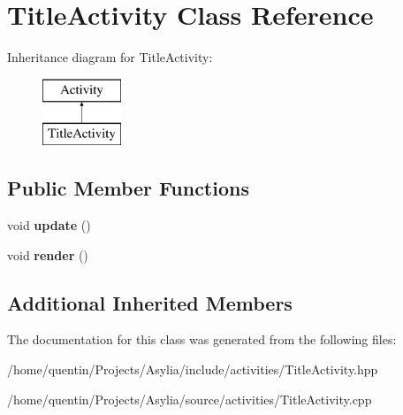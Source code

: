 \hypertarget{classTitleActivity}{\section{Title\-Activity Class Reference}
\label{classTitleActivity}
}
Inheritance diagram for Title\-Activity\-:\begin{figure}[H]
\begin{center}
\leavevmode
\includegraphics[height=2.000000cm]{classTitleActivity}
\end{center}
\end{figure}
\subsection*{Public Member Functions}
\begin{DoxyCompactItemize}
\item 
\hypertarget{classTitleActivity_a80c9fdc0811304a023b1ae19ee2e0b9f}{void {\bfseries update} ()}\label{classTitleActivity_a80c9fdc0811304a023b1ae19ee2e0b9f}

\item 
\hypertarget{classTitleActivity_af8800c5968935fbb710da6ea7a0e5e9f}{void {\bfseries render} ()}\label{classTitleActivity_af8800c5968935fbb710da6ea7a0e5e9f}

\end{DoxyCompactItemize}
\subsection*{Additional Inherited Members}


The documentation for this class was generated from the following files\-:\begin{DoxyCompactItemize}
\item 
/home/quentin/\-Projects/\-Asylia/include/activities/Title\-Activity.\-hpp\item 
/home/quentin/\-Projects/\-Asylia/source/activities/Title\-Activity.\-cpp\end{DoxyCompactItemize}
